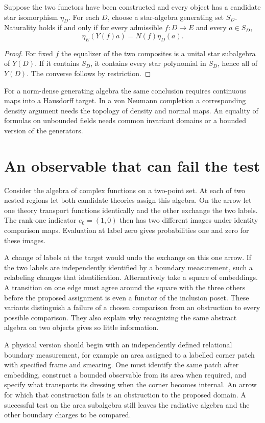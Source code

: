 \documentclass[11pt,letterpaper]{article}
\begin{document}
\begin{proposition}
Suppose the two functors have been constructed and every object has a candidate star isomorphism $\eta_D$. For each $D$, choose a star-algebra generating set $S_D$. Naturality holds if and only if for every admissible $f:D\to E$ and every $a\in S_D$,
\[
 \eta_E(Y(f)a)=N(f)\eta_D(a).
\]
\end{proposition}
\begin{proof}
For fixed $f$ the equalizer of the two composites is a unital star subalgebra of $Y(D)$. If it contains $S_D$, it contains every star polynomial in $S_D$, hence all of $Y(D)$. The converse follows by restriction.
\end{proof}
For a norm-dense generating algebra the same conclusion requires continuous maps into a Hausdorff target. In a von Neumann completion a corresponding density argument needs the topology of density and normal maps. An equality of formulas on unbounded fields needs common invariant domains or a bounded version of the generators.

\section{An observable that can fail the test}
Consider the algebra of complex functions on a two-point set. At each of two nested regions let both candidate theories assign this algebra. On the arrow let one theory transport functions identically and the other exchange the two labels. The rank-one indicator $e_0=(1,0)$ then has two different images under identity comparison maps. Evaluation at label zero gives probabilities one and zero for these images.

A change of labels at the target would undo the exchange on this one arrow. If the two labels are independently identified by a boundary measurement, such a relabeling changes that identification. Alternatively take a square of embeddings. A transition on one edge must agree around the square with the three others before the proposed assignment is even a functor of the inclusion poset. These variants distinguish a failure of a chosen comparison from an obstruction to every possible comparison. They also explain why recognizing the same abstract algebra on two objects gives so little information.

A physical version should begin with an independently defined relational boundary measurement, for example an area assigned to a labelled corner patch with specified frame and smearing. One must identify the same patch after embedding, construct a bounded observable from its area when required, and specify what transports its dressing when the corner becomes internal. An arrow for which that construction fails is an obstruction to the proposed domain. A successful test on the area subalgebra still leaves the radiative algebra and the other boundary charges to be compared.
\end{document}
